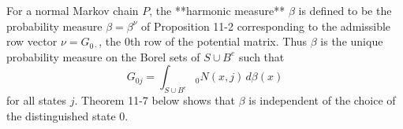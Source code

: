 For a normal Markov chain $P$, the **harmonic measure** $\beta$ is defined to be the probability measure $\beta = \beta^\nu$ of Proposition 11-2 corresponding to the admissible row vector $\nu = G_{0\cdot}$, the $0$th row of the potential matrix. Thus $\beta$ is the unique probability measure on the Borel sets of $S \cup B^e$ such that
$$G_{0j} = \int_{S \cup B^e} {}_0N(x, j) \, d\beta(x)$$
for all states $j$. Theorem 11-7 below shows that $\beta$ is independent of the choice of the distinguished state $0$.
